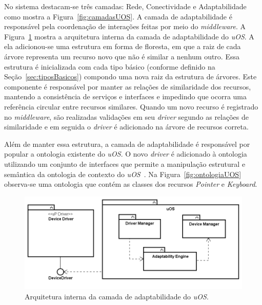 No sistema destacam-se três camadas: Rede, Conectividade e Adaptabilidade como mostra a Figura~\ref{fig:camadasUOS}. A camada de adaptabilidade é responsável pela coordenação de interações feitas por meio do \emph{middleware}. A Figura~\ref{fig:diagramaDeBlocos} mostra a arquitetura interna da camada de adaptabilidade do \emph{uOS}. A ela adicionou-se uma estrutura em forma de floresta, em que a raiz de cada árvore representa um recurso novo que não é similar a nenhum outro. Essa estrutura é inicializada com cada tipo básico (conforme definido na Seção~\ref{sec:tiposBasicos}) compondo uma nova raiz da estrutura de árvores. Este componente é responsável por manter as relações de similaridade dos recursos, mantendo a consistência de serviços e interfaces e impedindo que ocorra uma referência circular entre recursos similares. Quando um novo recurso é registrado no \emph{middleware}, são realizadas validações em seu \emph{driver} segundo as relações de similaridade e em seguida o \emph{driver} é adicionado na árvore de recursos correta.

Além de manter essa estrutura, a camada de adaptabilidade é responsável por popular a ontologia existente do \emph{uOS}. O novo \emph{driver} é adicionado à ontologia utilizando um conjunto de interfaces que permite a manipulação estrutural e semântica da ontologia de contexto do \emph{uOS}~\cite{ozakisbcup2011}. Na Figura~\ref{fig:ontologiaUOS} observa-se uma ontologia que contém as classes dos recursos \emph{Pointer} e \emph{Keyboard}.

\begin{figure}[ht]
	\center
	\includegraphics[scale=0.6]{imagens/diagramaDeBlocos}
	\caption{Arquitetura interna da camada de adaptabilidade do \emph{uOS}.}
	\label{fig:diagramaDeBlocos}
\end{figure}

